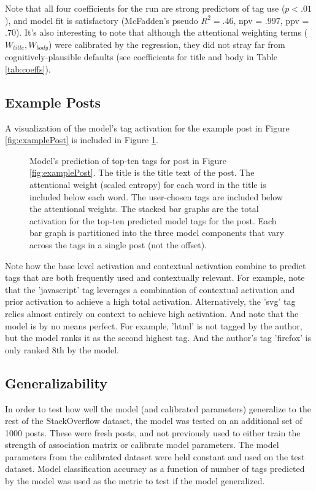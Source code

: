 \documentclass[10pt,letterpaper]{article}
\begin{document}
Note that all four coefficients for the run are strong predictors of tag use ($p<.01$), and model fit is satisfactory (McFadden's pseudo $R_{}^{2}=.46$, npv = .997, ppv = .70).
It's also interesting to note that although the attentional weighting terms ($W_{title}, W_{body}$) were calibrated by the regression, they did not stray far from cognitively-plausible defaults
(see coefficients for title and body in Table \ref{tab:coeffs}).

\subsection{Example Posts}

A visualization of the model's tag activation for the example post in Figure \ref{fig:examplePost} is included in Figure \ref{fig:modelPost}.

\begin{figure}[ht]
  \centering
  \caption{
    Model's prediction of top-ten tags for post in Figure \ref{fig:examplePost}.
    The title is the title text of the post.
    The attentional weight (scaled entropy) for each word in the title is included below each word.
    The user-chosen tags are included below the attentional weights.
    The stacked bar graphs are the total activation for the top-ten predicted model tags for the post.
    Each bar graph is partitioned into the three model components that vary across the tags in a single post (not the offset).
}
  \label{fig:modelPost}
\end{figure}

Note how the base level activation and contextual activation combine to predict tags that are both frequently used and contextually relevant.
For example, note that the 'javascript' tag leverages a combination of contextual activation and prior activation to achieve a high total activation.
Alternatively, the 'svg' tag relies almost entirely on context to achieve high activation.
And note that the model is by no means perfect.
For example, 'html' is not tagged by the author, but the model ranks it as the second highest tag.
And the author's tag 'firefox' is only ranked 8th by the model.

\subsection{Generalizability}

In order to test how well the model (and calibrated parameters) generalize to the rest of the StackOverflow dataset, the model was tested on an additional set of \num{1000} posts.
These were fresh posts, and not previously used to either train the strength of association matrix or calibrate model parameters.
The model parameters from the calibrated dataset were held constant and used on the test dataset.
Model classification accuracy as a function of number of tags predicted by the model was used as the metric to test if the model generalized.
\end{document}
